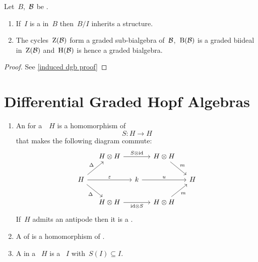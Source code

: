 \documentclass[a4paper,10pt,headings=standardclasses]{scrartcl}
\begin{document}

\begin{proposition}
  \label{induced dgb}
  Let~$B$,~$\mathcal{B}$ be {\dgbs}.
  \begin{enumerate}
    \item
      If~$I$ is a {\dgbi} in~$B$ then~$B/I$ inherits a {\dgb} structure.
    \item
      The cycles~$\operatorname{Z}(\mathcal{B})$ form a graded sub-bialgebra of~$\mathcal{B}$,~$\operatorname{B}(\mathcal{B})$ is a graded biideal in~$\operatorname{Z}(\mathcal{B})$ and~$\operatorname{H}(\mathcal{B})$ is hence a graded bialgebra.
  \end{enumerate}
\end{proposition}

\begin{proof}
  See \cref{induced dgb proof}
\end{proof}





\section{Differential Graded Hopf Algebras}

\begin{definition}
  \leavevmode
  \begin{enumerate}
    \item
      An  for a~{\dgb}~$H$ is a homomorphism of {\dgvs}
      \[
        S
        \colon
        H
        \to
        H
      \]
      that makes the following diagram commute:
      \begin{equation}
        \label{antipode diagram}
        \begin{tikzcd}[column sep = small]
          {}
          &
          H \tensor H
          \arrow{rr}[above]{S \tensor {\id}}
          &
          {}
          &
          H \tensor H
          \arrow{dr}[above right]{m}
          &
          {}
          \\
          H
          \arrow{ur}[above left]{\Delta}
          \arrow{rr}[above]{\varepsilon}
          \arrow{dr}[below left]{\Delta}
          &
          {}
          &
          k
          \arrow{rr}[above]{u}
          &
          {}
          &
          H
          \\
          {}
          &
          H \tensor H
          \arrow{rr}[below]{{\id} \tensor S}
          &
          {}
          &
          H \tensor H
          \arrow{ur}[below right]{m}
          &
          {}
        \end{tikzcd}
      \end{equation}
      If~$H$ admits an antipode then it is a .
    \item
      A  of {\dghs} is a homomorphism of {\dgbs}.
    \item
      A  in a {\dgh}~$H$ is a {\dgbi}~$I$ with~$S(I) \subseteq I$.
  \end{enumerate}
\end{definition}
\end{document}
